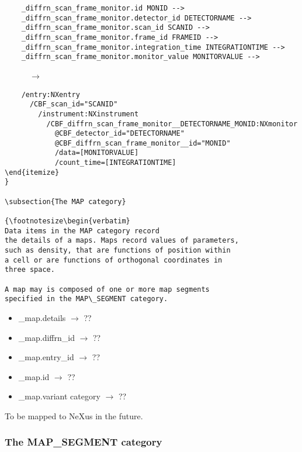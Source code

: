 \documentclass[11pt]{article}
\begin{document}
{{{\begin{verbatim}     
    _diffrn_scan_frame_monitor.id MONID -->
    _diffrn_scan_frame_monitor.detector_id DETECTORNAME -->
    _diffrn_scan_frame_monitor.scan_id SCANID -->
    _diffrn_scan_frame_monitor.frame_id FRAMEID -->
    _diffrn_scan_frame_monitor.integration_time INTEGRATIONTIME -->
    _diffrn_scan_frame_monitor.monitor_value MONITORVALUE -->
\end{verbatim}
~~~~~~{\bf{}$\rightarrow$}\\
\begin{verbatim}
    /entry:NXentry
      /CBF_scan_id="SCANID"
        /instrument:NXinstrument
          /CBF_diffrn_scan_frame_monitor__DETECTORNAME_MONID:NXmonitor
            @CBF_detector_id="DETECTORNAME"
            @CBF_diffrn_scan_frame_monitor__id="MONID"
            /data=[MONITORVALUE]  
            /count_time=[INTEGRATIONTIME] 
\end{itemize}
}

\subsection{The MAP category}

{\footnotesize\begin{verbatim}
Data items in the MAP category record
the details of a maps. Maps record values of parameters,
such as density, that are functions of position within
a cell or are functions of orthogonal coordinates in
three space.
  
A map may is composed of one or more map segments
specified in the MAP\_SEGMENT category.
\end{verbatim}}

\begin{itemize}

\item{\_map.details $\rightarrow$ ??}

\item{\_map.diffrn\_id $\rightarrow$ ??}

\item{\_map.entry\_id $\rightarrow$ ??}

\item{\_map.id $\rightarrow$ ??}

\item{\_map.variant category $\rightarrow$ ??}
\end{itemize}

To be mapped to NeXus in the future.

\subsubsection{The MAP\_SEGMENT category}

}}
\end{document}
